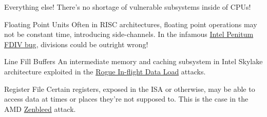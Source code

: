 \begin{frame}{Everything else!}
    There's no shortage of vulnerable subsystems inside of CPUs!
    \begin{block}{Floating Point Units}
        Often in RISC architectures, floating point operations may not be constant time, introducing side-channels. In the infamous \href{https://en.wikipedia.org/wiki/Pentium_FDIV_bug}{\color{pink}Intel Penitum FDIV bug}, divisions could be outright wrong!
    \end{block}
    \begin{block}{Line Fill Buffers}
        An intermediate memory and caching subsystem in Intel Skylake architecture exploited in the \href{https://www.ieee-security.org/TC/SP2019/papers/588.pdf}{\color{pink}Rogue In-flight Data Load} attacks.
    \end{block}
    \begin{block}{Register File}
        Certain registers, exposed in the ISA or otherwise, may be able to access data at times or places they're not supposed to. This is the case in the AMD \href{https://github.com/google/security-research/blob/master/pocs/cpus/zenbleed/}{\color{pink}Zenbleed} attack. 
    \end{block}
\end{frame}